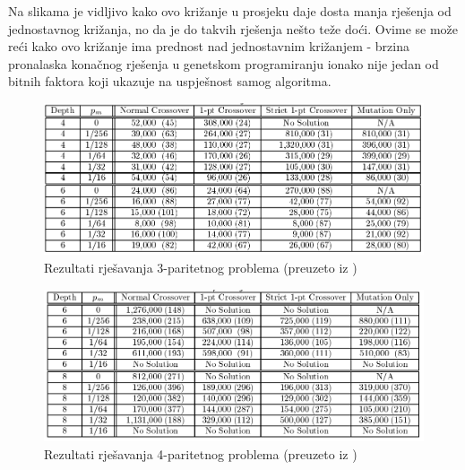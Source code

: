 Na slikama je vidljivo kako ovo križanje u prosjeku daje dosta manja rješenja od jednostavnog križanja, no da je do takvih rješenja nešto teže doći. Ovime se može reći kako ovo križanje ima prednost nad jednostavnim križanjem - brzina pronalaska konačnog rješenja u genetskom programiranju ionako nije jedan od bitnih faktora koji ukazuje na uspješnost samog algoritma.

 \begin{figure}[H]
	\centering
	\includegraphics[scale=0.4]{./slike/even3par.png}
	\caption{Rezultati rješavanja 3-paritetnog problema (preuzeto iz \cite{onePointExp})}
	\label{even3par}
\end{figure}

 \begin{figure}[H]
	\centering
	\includegraphics[scale=0.4]{./slike/even4par.png}
	\caption{Rezultati rješavanja 4-paritetnog problema (preuzeto iz \cite{onePointExp})}
	\label{even4par}
\end{figure}
